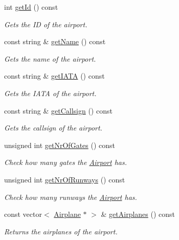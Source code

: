 \begin{DoxyCompactItemize}
int \mbox{\hyperlink{class_airport_ab7f1095f9c7bf4940bd5b375fa8a5fc4}{get\+Id}} () const
\begin{DoxyCompactList}\small\item\em Gets the ID of the airport. \end{DoxyCompactList}\item 
const string \& \mbox{\hyperlink{class_airport_aa5be38443c1de176e52c4f5f5252c956}{get\+Name}} () const
\begin{DoxyCompactList}\small\item\em Gets the name of the airport. \end{DoxyCompactList}\item 
const string \& \mbox{\hyperlink{class_airport_aa127b88a8221fa23977c4fa6e37eee5b}{get\+I\+A\+TA}} () const
\begin{DoxyCompactList}\small\item\em Gets the I\+A\+TA of the airport. \end{DoxyCompactList}\item 
const string \& \mbox{\hyperlink{class_airport_a7fd582a5f9554830247f724ddc031d84}{get\+Callsign}} () const
\begin{DoxyCompactList}\small\item\em Gets the callsign of the airport. \end{DoxyCompactList}\item 
unsigned int \mbox{\hyperlink{class_airport_a14b74da2358af81c5b5df67aa52b14b6}{get\+Nr\+Of\+Gates}} () const
\begin{DoxyCompactList}\small\item\em Check how many gates the \mbox{\hyperlink{class_airport}{Airport}} has. \end{DoxyCompactList}\item 
unsigned int \mbox{\hyperlink{class_airport_ae65f2bbf4060d54a3c282f18928790a0}{get\+Nr\+Of\+Runways}} () const
\begin{DoxyCompactList}\small\item\em Check how many runways the \mbox{\hyperlink{class_airport}{Airport}} has. \end{DoxyCompactList}\item 
const vector$<$ \mbox{\hyperlink{class_airplane}{Airplane}} $\ast$ $>$ \& \mbox{\hyperlink{class_airport_a1c2d6645864e47ff409ea9233add81d4}{get\+Airplanes}} () const
\begin{DoxyCompactList}\small\item\em Returns the airplanes of the airport. \end{DoxyCompactList}\item 

\end{DoxyCompactItemize}
